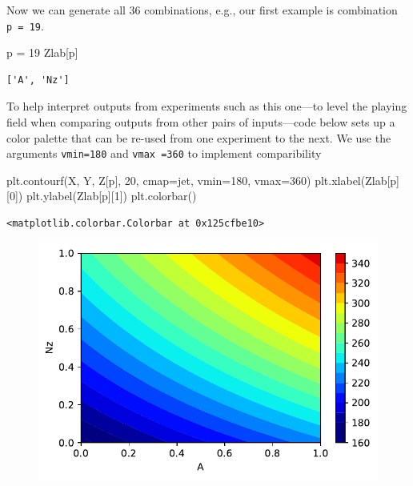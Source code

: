 \documentclass[
  letterpaper,
  DIV=11,
  numbers=noendperiod]{scrreprt}
\newenvironment{Shaded}{\begin{snugshade}}{\end{snugshade}}
\newcommand{\DecValTok}[1]{\textcolor[rgb]{0.68,0.00,0.00}{#1}}
\newcommand{\NormalTok}[1]{\textcolor[rgb]{0.00,0.23,0.31}{#1}}
\newcommand{\OperatorTok}[1]{\textcolor[rgb]{0.37,0.37,0.37}{#1}}
\newcommand{\StringTok}[1]{\textcolor[rgb]{0.13,0.47,0.30}{#1}}
\begin{document}
Now we can generate all 36 combinations, e.g., our first example is
combination \texttt{p\ =\ 19}.

\begin{Shaded}
\begin{Highlighting}[]
\NormalTok{p }\OperatorTok{=} \DecValTok{19}
\NormalTok{Zlab[p]}
\end{Highlighting}
\end{Shaded}

\begin{verbatim}
['A', 'Nz']
\end{verbatim}

To help interpret outputs from experiments such as this one---to level
the playing field when comparing outputs from other pairs of
inputs---code below sets up a color palette that can be re-used from one
experiment to the next. We use the arguments \texttt{vmin=180} and
\texttt{vmax\ =360} to implement comparibility

\begin{Shaded}
\begin{Highlighting}[]
\NormalTok{plt.contourf(X, Y, Z[p], }\DecValTok{20}\NormalTok{, cmap}\OperatorTok{=}\StringTok{\textquotesingle{}jet\textquotesingle{}}\NormalTok{, vmin}\OperatorTok{=}\DecValTok{180}\NormalTok{, vmax}\OperatorTok{=}\DecValTok{360}\NormalTok{)}
\NormalTok{plt.xlabel(Zlab[p][}\DecValTok{0}\NormalTok{])}
\NormalTok{plt.ylabel(Zlab[p][}\DecValTok{1}\NormalTok{])}
\NormalTok{plt.colorbar()}
\end{Highlighting}
\end{Shaded}

\begin{verbatim}
<matplotlib.colorbar.Colorbar at 0x125cfbe10>
\end{verbatim}

\begin{figure}[H]

{\centering \includegraphics{002_awwe_files/figure-pdf/cell-11-output-2.pdf}

}

\end{figure}
\end{document}
